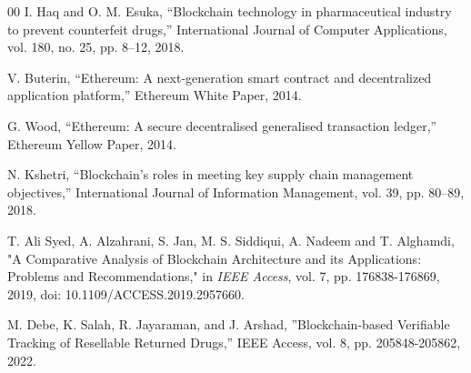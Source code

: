\documentclass[conference]{IEEEtran}
\begin{document}
\begin{thebibliography}{00}
 I. Haq and O. M. Esuka, ``Blockchain technology in pharmaceutical industry to prevent counterfeit drugs,'' International Journal of Computer Applications, vol. 180, no. 25, pp. 8--12, 2018.

 V. Buterin, ``Ethereum: A next-generation smart contract and decentralized application platform,'' Ethereum White Paper, 2014.

 G. Wood, ``Ethereum: A secure decentralised generalised transaction ledger,'' Ethereum Yellow Paper, 2014.

 N. Kshetri, ``Blockchain's roles in meeting key supply chain management objectives,'' International Journal of Information Management, vol. 39, pp. 80--89, 2018.

 T. Ali Syed, A. Alzahrani, S. Jan, M. S. Siddiqui, A. Nadeem 
and T. Alghamdi, "A Comparative Analysis of Blockchain Architecture and its Applications: Problems and Recommendations," in \textit{IEEE Access}, vol. 7, pp. 176838-176869, 2019, doi: 10.1109/ACCESS.2019.2957660.

 M. Debe, K. Salah, R. Jayaraman, and J. Arshad, ”Blockchain-based
Verifiable Tracking of Resellable Returned Drugs,” IEEE Access, vol.
8, pp. 205848-205862, 2022.



\end{thebibliography}
\end{document}
